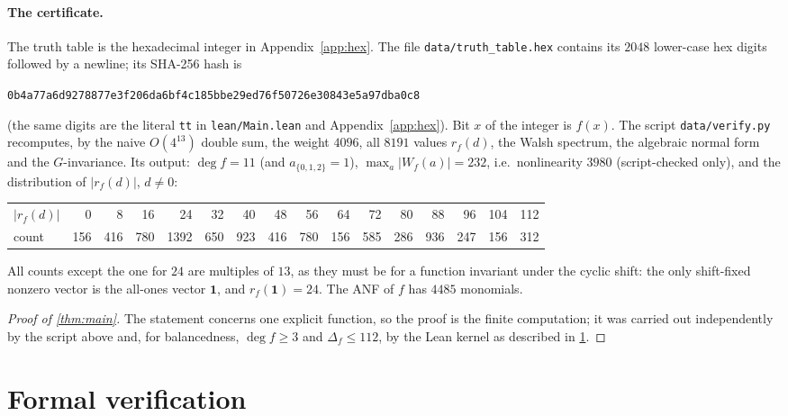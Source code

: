 \documentclass[11pt]{article}
\numberwithin{equation}{section}
\theoremstyle{definition}
\theoremstyle{remark}
\begin{document}
\paragraph{The certificate.} The truth table is the hexadecimal integer in Appendix~\ref{app:hex}. The file
\texttt{data/truth\_table.hex} contains its $2048$ lower-case hex digits followed by a newline; its SHA-256
hash is
\begin{center}\small
\texttt{0b4a77a6d9278877e3f206da6bf4c185bbe29ed76f50726e30843e5a97dba0c8}
\end{center}
(the same digits are the literal \texttt{tt} in \texttt{lean/Main.lean} and Appendix~\ref{app:hex}).
Bit $x$ of the integer is $f(x)$. The script \texttt{data/verify.py} recomputes, by the naive $O(4^{13})$ double sum, the
weight $4096$, all $8191$ values $r_f(d)$, the Walsh spectrum, the algebraic normal form and the
$G$-invariance. Its output: $\deg f=11$ (and $a_{\{0,1,2\}}=1$), $\max_a|W_f(a)|=232$, i.e.\
nonlinearity $3980$ (script-checked only), and the distribution of $|r_f(d)|$, $d\neq0$:

\begin{center}\small
\begin{tabular}{l*{15}{r}}
\toprule
$|r_f(d)|$ & 0 & 8 & 16 & 24 & 32 & 40 & 48 & 56 & 64 & 72 & 80 & 88 & 96 & 104 & 112\\
count & 156 & 416 & 780 & 1392 & 650 & 923 & 416 & 780 & 156 & 585 & 286 & 936 & 247 & 156 & 312\\
\bottomrule
\end{tabular}
\end{center}
All counts except the one for $24$ are multiples of $13$, as they must be for a function invariant under
the cyclic shift: the only shift-fixed nonzero vector is the all-ones vector $\mathbf 1$, and
$r_f(\mathbf 1)=24$. The ANF of $f$ has $4485$ monomials.

\begin{proof}[Proof of \cref{thm:main}]
The statement concerns one explicit function, so the proof is the finite computation; it was carried
out independently by the script above and, for balancedness, $\deg f\ge3$ and $\Delta_f\le112$, by the Lean
kernel as described in \cref{sec:lean}.
\end{proof}

\section{Formal verification}\label{sec:lean}
\end{document}
